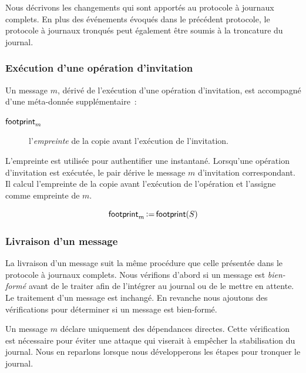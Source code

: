 Nous décrivons les changements qui sont apportés au protocole à journaux complets.
En plus des événements évoqués dans le précédent protocole, le protocole à journaux tronqués peut également être soumis à la troncature du journal.

\subsubsection{Exécution d'une opération d'invitation}

Un message $m$, dérivé de l'exécution d'une opération d'invitation, est accompagné d'une méta-donnée supplémentaire~:
\begin{description}
    \item[$\operatorname{\mathsf{footprint}}_m$] l'\emph{empreinte} de la copie avant l'exécution de l'invitation.
\end{description}

L'empreinte est utilisée pour authentifier une instantané.
Lorsqu'une opération d'invitation est exécutée, le pair dérive le message $m$ d'invitation correspondant.
Il calcul l'empreinte de la copie avant l'exécution de l'opération et l'assigne comme empreinte de $m$.

\begin{equation*}
    \operatorname{\mathsf{footprint}}_m \operatorname{\vcentcolon=} \operatorname{\mathsf{footprint}}(S)
\end{equation*}


\subsubsection{Livraison d'un message}

La livraison d'un message suit la même procédure que celle présentée dans le protocole à journaux complets.
Nous vérifions d'abord si un message est \emph{bien-formé} avant de le traiter afin de l'intégrer au journal ou de le mettre en attente.
Le traitement d'un message est inchangé.
En revanche nous ajoutons des vérifications pour déterminer si un message est bien-formé.

Un message $m$ déclare uniquement des dépendances directes.
Cette vérification est nécessaire pour éviter une attaque qui viserait à empêcher la stabilisation du journal.
Nous en reparlons lorsque nous développerons les étapes pour tronquer le journal.

